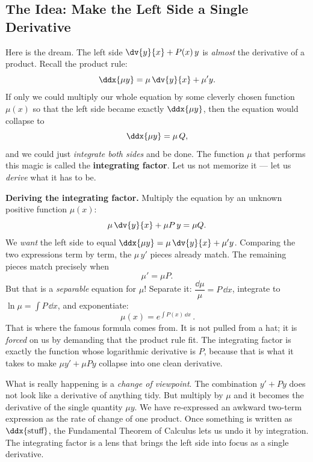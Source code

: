 \subsection{The Idea: Make the Left Side a Single Derivative}

Here is the dream. The left side $\dv{y}{x} + P(x)\,y$ is \emph{almost} the
derivative of a product. Recall the product rule:
\[
  \ddx{\mu y} = \mu\,\dv{y}{x} + \mu' y.
\]
If only we could multiply our whole equation by some cleverly chosen function
$\mu(x)$ so that the left side became exactly $\ddx{\mu y}$, then the equation would
collapse to
\[
  \ddx{\mu y} = \mu\,Q,
\]
and we could just \emph{integrate both sides} and be done. The function $\mu$ that
performs this magic is called the \textbf{integrating factor}. Let us not memorize
it --- let us \emph{derive} what it has to be.

\begin{whybox}
\textbf{Deriving the integrating factor.} Multiply the equation by an unknown
positive function $\mu(x)$:
\[
  \mu\,\dv{y}{x} + \mu P\,y = \mu Q.
\]
We \emph{want} the left side to equal $\ddx{\mu y} = \mu\,\dv{y}{x} + \mu' y$.
Comparing the two expressions term by term, the $\mu\,y'$ pieces already match. The
remaining pieces match precisely when
\[
  \mu' = \mu P.
\]
But that is a \emph{separable} equation for $\mu$! Separate it:
$\dfrac{\dd\mu}{\mu} = P\,\dd x$, integrate to $\ln\mu = \int P\,\dd x$, and
exponentiate:
\[
  \boxed{\,\mu(x) = e^{\int P(x)\,\dd x}\,}.
\]
That is where the famous formula comes from. It is not pulled from a hat; it is
\emph{forced} on us by demanding that the product rule fit. The integrating factor
is exactly the function whose logarithmic derivative is $P$, because that is what it
takes to make $\mu y'+\mu P y$ collapse into one clean derivative.
\end{whybox}

\begin{happeningbox}
What is really happening is a \emph{change of viewpoint}. The combination
$y' + Py$ does not look like a derivative of anything tidy. But multiply by $\mu$
and it becomes the derivative of the single quantity $\mu y$. We have re-expressed
an awkward two-term expression as the rate of change of one product. Once something
is written as $\ddx{\text{stuff}}$, the Fundamental Theorem of Calculus lets us undo
it by integration. The integrating factor is a lens that brings the left side into
focus as a single derivative.
\end{happeningbox}

